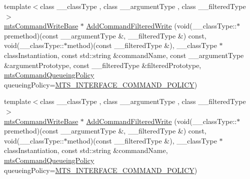 {\bf }\par
\begin{DoxyCompactItemize}
\item 
{\footnotesize template$<$class \-\_\-\-\_\-class\-Type , class \-\_\-\-\_\-argument\-Type , class \-\_\-\-\_\-filtered\-Type $>$ }\\\hyperlink{classmts_command_write_base}{mts\-Command\-Write\-Base} $\ast$ \hyperlink{classmts_interface_provided_a5767c658f8ecad34cb84bd54032498a9}{Add\-Command\-Filtered\-Write} (void(\-\_\-\-\_\-class\-Type\-::$\ast$premethod)(const \-\_\-\-\_\-argument\-Type \&, \-\_\-\-\_\-filtered\-Type \&) const, void(\-\_\-\-\_\-class\-Type\-::$\ast$method)(const \-\_\-\-\_\-filtered\-Type \&), \-\_\-\-\_\-class\-Type $\ast$class\-Instantiation, const std\-::string \&command\-Name, const \-\_\-\-\_\-argument\-Type \&argument\-Prototype, const \-\_\-\-\_\-filtered\-Type \&filtered\-Prototype, \hyperlink{mts_forward_declarations_8h_aa2ac24035e136fa1689dcc2854c63fc7}{mts\-Command\-Queueing\-Policy} queueing\-Policy=\hyperlink{mts_forward_declarations_8h_aa2ac24035e136fa1689dcc2854c63fc7a4f444b4120a5e2efd084e2e5a214f5c8}{M\-T\-S\-\_\-\-I\-N\-T\-E\-R\-F\-A\-C\-E\-\_\-\-C\-O\-M\-M\-A\-N\-D\-\_\-\-P\-O\-L\-I\-C\-Y})
\item 
{\footnotesize template$<$class \-\_\-\-\_\-class\-Type , class \-\_\-\-\_\-argument\-Type , class \-\_\-\-\_\-filtered\-Type $>$ }\\\hyperlink{classmts_command_write_base}{mts\-Command\-Write\-Base} $\ast$ \hyperlink{classmts_interface_provided_a215a464ca57a8df980d1f68415f24795}{Add\-Command\-Filtered\-Write} (void(\-\_\-\-\_\-class\-Type\-::$\ast$premethod)(const \-\_\-\-\_\-argument\-Type \&, \-\_\-\-\_\-filtered\-Type \&) const, void(\-\_\-\-\_\-class\-Type\-::$\ast$method)(const \-\_\-\-\_\-filtered\-Type \&), \-\_\-\-\_\-class\-Type $\ast$class\-Instantiation, const std\-::string \&command\-Name, \hyperlink{mts_forward_declarations_8h_aa2ac24035e136fa1689dcc2854c63fc7}{mts\-Command\-Queueing\-Policy} queueing\-Policy=\hyperlink{mts_forward_declarations_8h_aa2ac24035e136fa1689dcc2854c63fc7a4f444b4120a5e2efd084e2e5a214f5c8}{M\-T\-S\-\_\-\-I\-N\-T\-E\-R\-F\-A\-C\-E\-\_\-\-C\-O\-M\-M\-A\-N\-D\-\_\-\-P\-O\-L\-I\-C\-Y})
\end{DoxyCompactItemize}


